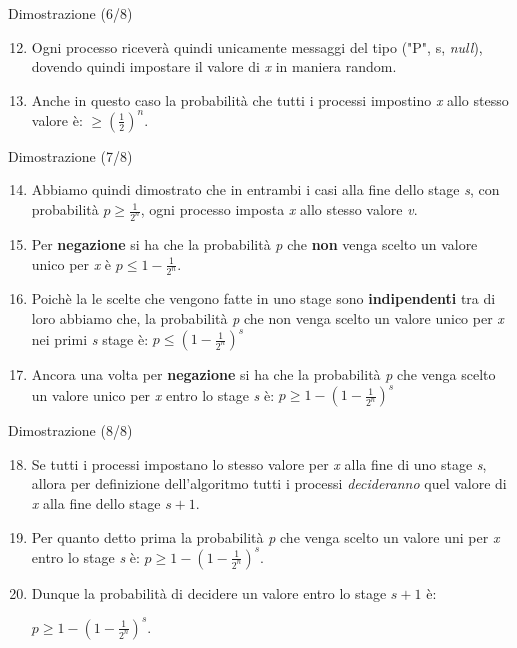\documentclass{beamer}
\begin{document}
\begin{frame}{Dimostrazione (6/8)}
    \begin{enumerate}
        \setcounter{enumi}{11}
        \item<1-> Ogni processo riceverà quindi unicamente messaggi del tipo ("P", s, \textit{null}), dovendo quindi impostare il valore di \textit{x} in maniera random.
        \item<2-> Anche in questo caso la probabilità che tutti i processi impostino \textit{x} allo stesso valore è: $\geq (\frac{1}{2})^n$.
    \end{enumerate}
\end{frame}

\begin{frame}{Dimostrazione (7/8)}
    \begin{enumerate}
        \setcounter{enumi}{13}
        \item Abbiamo quindi dimostrato che in entrambi i casi alla fine dello stage \textit{s}, con probabilità $p \geq \frac{1}{2^n}$, ogni processo imposta \textit{x} allo stesso valore \textit{v}.
        \item Per \textbf{negazione} si ha che la probabilità \textit{p} che \textbf{non} venga scelto un valore unico per \textit{x} è $p \leq 1 - \frac{1}{2^n}$.
        \item Poichè la le scelte che vengono fatte in uno stage sono \textbf{indipendenti} tra di loro abbiamo che, la probabilità \textit{p} che non venga scelto un valore unico per \textit{x} nei primi \textit{s} stage è: $p \leq (1 - \frac{1}{2^n})^s$
        \item Ancora una volta per \textbf{negazione} si ha che la probabilità \textit{p} che venga scelto un valore unico per \textit{x} entro lo stage \textit{s} è: $p \geq 1 - (1 - \frac{1}{2^n})^s$ 
    \end{enumerate}
\end{frame}

\begin{frame}{Dimostrazione (8/8)}
    \begin{enumerate}
        \setcounter{enumi}{17}
        \item Se tutti i processi impostano lo stesso valore per \textit{x} alla fine di uno stage \textit{s}, allora per definizione dell'algoritmo tutti i processi \textit{decideranno} quel valore di \textit{x} alla fine dello stage $s + 1$.
        \item Per quanto detto prima la probabilità \textit{p} che venga scelto un valore uni per \textit{x} entro lo stage \textit{s} è: $p \geq 1 - (1 - \frac{1}{2^n})^s$. 
        \item Dunque la probabilità di decidere un valore entro lo stage $s + 1$ è:
        \begin{center}
            \Large
            $p \geq 1 - (1 - \frac{1}{2^n})^s$.
        \end{center}
    \end{enumerate}
\end{frame}
\end{document}
